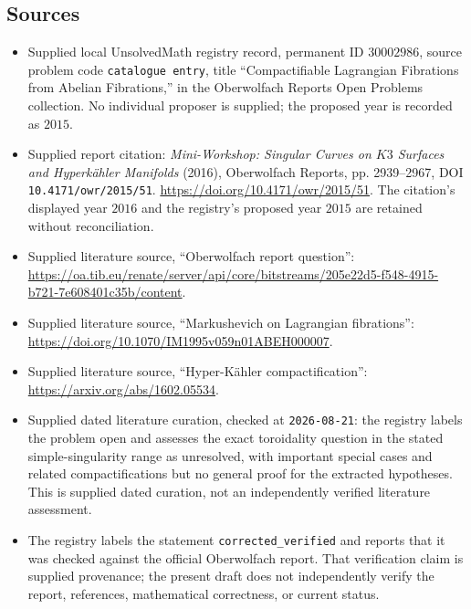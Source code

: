 \documentclass[11pt]{article}
\begin{document}
\subsection{Sources}
\begin{itemize}
\item Supplied local UnsolvedMath registry record, permanent ID \(30002986\), source problem code \texttt{catalogue entry}, title ``Compactifiable Lagrangian Fibrations from Abelian Fibrations,'' in the Oberwolfach Reports Open Problems collection. No individual proposer is supplied; the proposed year is recorded as \(2015\).
\item Supplied report citation: \emph{Mini-Workshop: Singular Curves on \(K3\) Surfaces and Hyperkähler Manifolds} (2016), Oberwolfach Reports, pp. 2939--2967, DOI \texttt{10.4171/owr/2015/51}. \url{https://doi.org/10.4171/owr/2015/51}. The citation's displayed year \(2016\) and the registry's proposed year \(2015\) are retained without reconciliation.
\item Supplied literature source, ``Oberwolfach report question'': \url{https://oa.tib.eu/renate/server/api/core/bitstreams/205e22d5-f548-4915-b721-7e608401c35b/content}.
\item Supplied literature source, ``Markushevich on Lagrangian fibrations'': \url{https://doi.org/10.1070/IM1995v059n01ABEH000007}.
\item Supplied literature source, ``Hyper-Kähler compactification'': \url{https://arxiv.org/abs/1602.05534}.
\item Supplied dated literature curation, checked at \texttt{2026-08-21}: the registry labels the problem open and assesses the exact toroidality question in the stated simple-singularity range as unresolved, with important special cases and related compactifications but no general proof for the extracted hypotheses. This is supplied dated curation, not an independently verified literature assessment.
\item The registry labels the statement \texttt{corrected\_verified} and reports that it was checked against the official Oberwolfach report. That verification claim is supplied provenance; the present draft does not independently verify the report, references, mathematical correctness, or current status.
\end{itemize}
\end{document}
